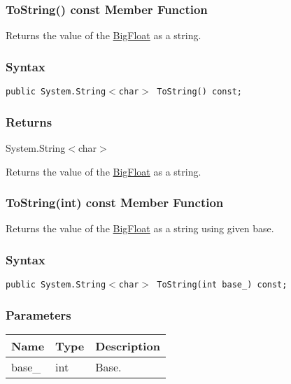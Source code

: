 \documentclass[a4paper,oneside,11.000000pt]{book}
\begin{document}
\hypertarget{System.Numerics.Multiprecision.BigFloat.ToString.C.P.System.Numerics.Multiprecision.BigFloat}{\subsubsection*{ToString() const Member Function}}
\begin{flushleft}
Returns the value of the \hyperlink{System.Numerics.Multiprecision.BigFloat}{BigFloat} as a string.

\end{flushleft}
\subsubsection*{Syntax}
\texttt{public System.String$<$char$>$ ToString() const;}
\subsubsection*{Returns}System.\-String$<$\-char$>$\-
\begin{flushleft}
Returns the value of the \hyperlink{System.Numerics.Multiprecision.BigFloat}{BigFloat} as a string.

\end{flushleft}
\clearpage

\hypertarget{System.Numerics.Multiprecision.BigFloat.ToString.C.P.System.Numerics.Multiprecision.BigFloat.int}{\subsubsection*{ToString(int) const Member Function}}
\begin{flushleft}
Returns the value of the \hyperlink{System.Numerics.Multiprecision.BigFloat}{BigFloat} as a string using given base.

\end{flushleft}
\subsubsection*{Syntax}
\texttt{public System.String$<$char$>$ ToString(int base\_) const;}
\subsubsection*{Parameters}
\begin{flushleft}
\begin{supertabular}[l]{lll}
\textbf{Name}
& \textbf{Type}
& \textbf{Description}
\\
\hline
base\_
& int
& Base.

\\
\end{supertabular}

\end{flushleft}
\end{document}
